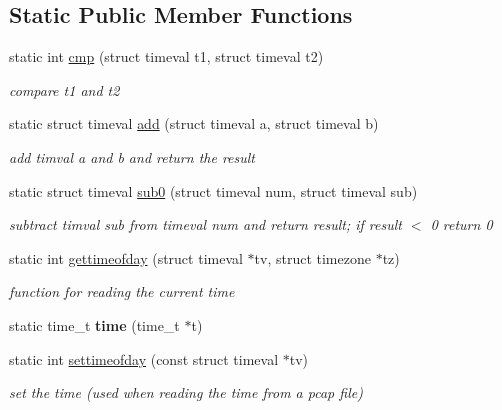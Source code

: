 \subsection*{Static Public Member Functions}
\begin{DoxyCompactItemize}
\item 
static int \hyperlink{classTimeval_acda4495a9c75a5bb80949942f0ffc4a8}{cmp} (struct timeval t1, struct timeval t2)
\begin{DoxyCompactList}\small\item\em compare t1 and t2 \end{DoxyCompactList}\item 
\mbox{\label{classTimeval_ac6bccadd9a389836cd233abea19d638a}} 
static struct timeval \hyperlink{classTimeval_ac6bccadd9a389836cd233abea19d638a}{add} (struct timeval a, struct timeval b)
\begin{DoxyCompactList}\small\item\em add timval a and b and return the result \end{DoxyCompactList}\item 
\mbox{\label{classTimeval_ab7aa37a041b6d357827af7df8ce18e14}} 
static struct timeval \hyperlink{classTimeval_ab7aa37a041b6d357827af7df8ce18e14}{sub0} (struct timeval num, struct timeval sub)
\begin{DoxyCompactList}\small\item\em subtract timval sub from timeval num and return result; if result $<$ 0 return 0 \end{DoxyCompactList}\item 
\mbox{\label{classTimeval_a337f03858c741d8cf77d7a75ca538613}} 
static int \hyperlink{classTimeval_a337f03858c741d8cf77d7a75ca538613}{gettimeofday} (struct timeval $\ast$tv, struct timezone $\ast$tz)
\begin{DoxyCompactList}\small\item\em function for reading the current time \end{DoxyCompactList}\item 
\mbox{\label{classTimeval_a847e219f1d9a929c64023ff38b52da91}} 
static time\+\_\+t {\bfseries time} (time\+\_\+t $\ast$t)
\item 
\mbox{\label{classTimeval_a6527fdc78ecf3563d37cccd4e4ec670c}} 
static int \hyperlink{classTimeval_a6527fdc78ecf3563d37cccd4e4ec670c}{settimeofday} (const struct timeval $\ast$tv)
\begin{DoxyCompactList}\small\item\em set the time (used when reading the time from a pcap file) \end{DoxyCompactList}\end{DoxyCompactItemize}


